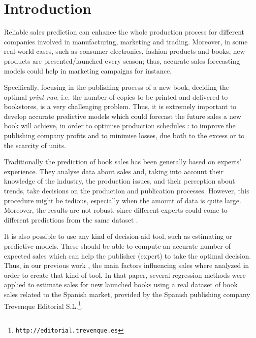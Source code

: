 \documentclass[a4paper,10pt,onecolumn,preprint,3p]{elsarticle}
\begin{document}
\section{Introduction}
\label{sec:intro}


Reliable sales prediction can enhance the whole production process for different 
companies involved in manufacturing, marketing and trading.
Moreover, in some real-world cases, such as consumer electronics, fashion products and books, new products are presented/launched every season; thus, accurate sales forecasting models could help in marketing campaigns for instance.

Specifically, focusing in the publishing process of a new book, deciding the optimal {\em  print run}, i.e. the number of copies to be printed and delivered to bookstores, is a very challenging problem. Thus, it is extremely
important to develop accurate predictive models which could forecast
the future sales a new book will achieve, in order to optimise
production schedules \cite{Fildes2010,Saeed2008,Zhao2001}: to improve the publishing company profits and to minimise losses, due both to the excess or to the scarcity of units. 

Traditionally the prediction of book sales has been generally based on experts' experience. They analyse data about sales and, taking into account their knowledge of the industry, the production issues, and their perception about trends, take decisions on the production and publication processes.
However, this procedure might be tedious, especially when the amount of data is 
quite large. Moreover, the results are not robust, since different experts could come to different predictions from the same dataset \cite{Sanders1994}.

It is also possible to use any kind of decision-aid tool, such as estimating or predictive models. These should be able to compute an accurate number of expected sales which can help the publisher (expert) to take the optimal decision. 
Thus, in our previous work \cite{Castillo2016books}, the main factors influencing sales where analyzed in order to create that kind of tool.
In that paper, several regression methods were applied to estimate sales for new launched books using a real dataset of book sales related to the Spanish market, provided by the Spanish publishing company Trevenque Editorial S.L.\footnote{\tt http://editorial.trevenque.es}.
\end{document}
